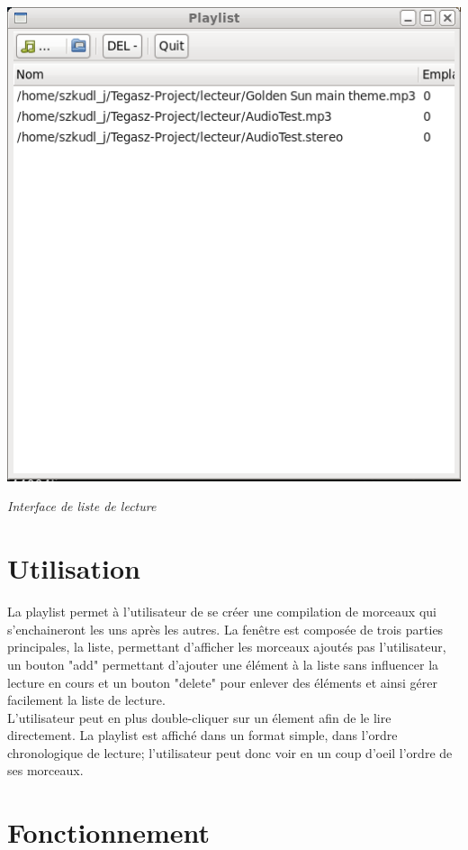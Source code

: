 \documentclass[12pt,a4paper]{report}
\begin{document}
\begin{center}
\includegraphics[scale=0.5]{playlist.png}

\it{Interface de liste de lecture}

\end{center}

\section{Utilisation}

La playlist permet à l'utilisateur de se créer une compilation de morceaux qui s'enchaineront les uns après les autres. La fenêtre est composée de trois parties principales, la liste, permettant d'afficher les morceaux ajoutés pas l'utilisateur, un bouton "add" permettant d'ajouter une élément à la liste sans influencer la lecture en cours et un bouton "delete" pour enlever des éléments et ainsi gérer facilement la liste de lecture.\\

L'utilisateur peut en plus double-cliquer sur un élement afin de le lire directement. La playlist est affiché dans un format simple, dans l'ordre chronologique de lecture; l'utilisateur peut donc voir en un coup d'oeil l'ordre de ses morceaux.

\section{Fonctionnement}
\end{document}
